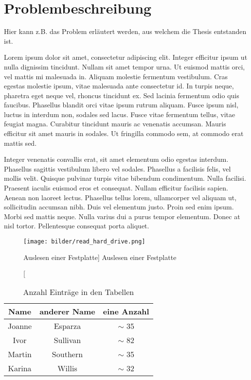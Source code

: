 \section{Problembeschreibung}

Hier kann z.B. das Problem erläutert werden, aus welchem die Thesis entstanden ist.

Lorem ipsum dolor sit amet, consectetur adipiscing elit. Integer efficitur ipsum ut nulla dignissim tincidunt. Nullam sit amet tempor urna. Ut euismod mattis orci, vel mattis mi malesuada in. Aliquam molestie fermentum vestibulum. Cras egestas molestie ipsum, vitae malesuada ante consectetur id. In turpis neque, pharetra eget neque vel, rhoncus tincidunt ex. Sed lacinia fermentum odio quis faucibus. Phasellus blandit orci vitae ipsum rutrum aliquam. Fusce ipsum nisl, luctus in interdum non, sodales sed lacus. Fusce vitae fermentum tellus, vitae feugiat magna. Curabitur tincidunt mauris ac venenatis accumsan. Mauris efficitur sit amet mauris in sodales. Ut fringilla commodo sem, at commodo erat mattis sed.

Integer venenatis convallis erat, sit amet elementum odio egestas interdum. Phasellus sagittis vestibulum libero vel sodales. Phasellus a facilisis felis, vel mollis velit. Quisque pulvinar turpis vitae bibendum condimentum. Nulla facilisi. Praesent iaculis euismod eros et consequat. Nullam efficitur facilisis sapien. Aenean non laoreet lectus. Phasellus tellus lorem, ullamcorper vel aliquam ut, sollicitudin accumsan nibh. Duis vel elementum justo. Proin sed enim ipsum. Morbi sed mattis neque. Nulla varius dui a purus tempor elementum. Donec at nisl tortor. Pellentesque consequat porta aliquet. 

\clearpage

\begin{figure}[ht]
    \centering
    \texttt{[image: bilder/read\_hard\_drive.png]} %
    \caption
    [Auslesen einer Festplatte] %
    {Auslesen einer Festplatte\cite{quelle}} %
    \label{fig:old_db}
\end{figure}

\begin{wraptable}[9]{r}{8cm} 
\begin{center}
\begin{tabular}{||c c c||} 
    \hline
    Name & anderer Name & eine Anzahl \\ [0.5ex] 
    \hline\hline
    Joanne &
    Esparza &
    $\sim$ 35 \\
    \hline
    Ivor &
    Sullivan &
    $\sim$ 82 \\ 
    \hline
    Martin & 
    Southern &
    $\sim$ 35 \\
    \hline
    Karina & 
    Willis &
    $\sim$ 32 \\
    \hline
\end{tabular}
\end{center}
\caption{Anzahl Einträge in den Tabellen}
\label{tab:bsp_tabelle}
\end{wraptable} 

